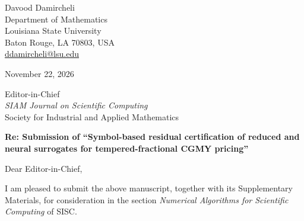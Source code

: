 \documentclass[11pt]{article}
\begin{document}
\noindent Davood Damircheli\\
Department of Mathematics\\
Louisiana State University\\
Baton Rouge, LA 70803, USA\\
\href{mailto:ddamircheli@lsu.edu}{ddamircheli@lsu.edu}

November 22, 2026

Editor-in-Chief\\
\emph{SIAM Journal on Scientific Computing}\\
Society for Industrial and Applied Mathematics

\textbf{Re: Submission of ``Symbol-based residual certification of reduced and neural surrogates for
tempered-fractional CGMY pricing''}

Dear Editor-in-Chief,

I am pleased to submit the above manuscript, together with its Supplementary Materials, for
consideration in the section \emph{Numerical Algorithms for Scientific Computing} of SISC.
\end{document}
